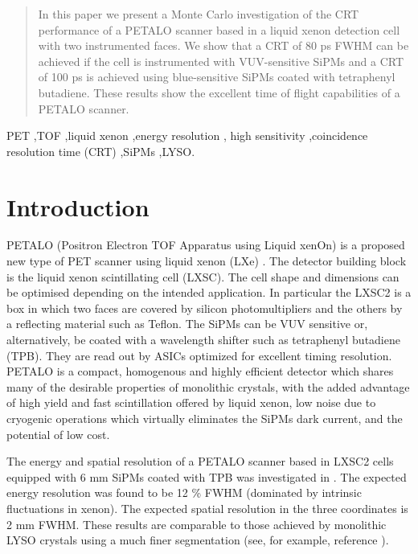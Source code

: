\documentclass[review]{elsarticle}
\begin{document}
\begin{frontmatter}
\begin{abstract}
In this paper we present a Monte Carlo investigation of the CRT performance of a
PETALO scanner based in a liquid xenon detection cell with two instrumented faces. We show that a CRT of 80 ps FWHM can be achieved if the cell is instrumented with VUV-sensitive SiPMs and a CRT of 100 ps is achieved using blue-sensitive SiPMs coated with tetraphenyl butadiene. These results show the excellent time of flight capabilities of a PETALO scanner.   
 \end{abstract}

\begin{keyword}
PET \sep TOF \sep liquid xenon \sep energy resolution \sep
 high sensitivity \sep coincidence resolution time (CRT) \sep SiPMs \sep LYSO.
\end{keyword}

\end{frontmatter}



\section{Introduction}

PETALO (Positron Electron TOF Apparatus using Liquid xenOn) is a proposed new type of PET scanner using liquid xenon (LXe) \cite{Petalo2015}. The detector building block is the liquid xenon scintillating cell (LXSC). The cell shape and dimensions can be optimised depending on the intended application. In particular the LXSC2 is a box in which two faces are covered by silicon photomultipliers and the others by a reflecting material such as Teflon. The SiPMs can be VUV sensitive or, alternatively, be coated with a wavelength shifter such as tetraphenyl butadiene (TPB).  They are read out by ASICs optimized for excellent timing resolution. PETALO is a compact, homogenous and highly efficient detector which shares many of the desirable properties of monolithic crystals, with the added advantage of high yield and fast scintillation offered by liquid xenon, low noise due to cryogenic operations which virtually eliminates the SiPMs dark current, and the potential of low cost. 

The energy and spatial resolution of a PETALO scanner based in LXSC2 cells equipped with 6 mm SiPMs coated with TPB was investigated in \cite{Petalo2015}. The expected energy resolution was found to be 12 \% FWHM (dominated by intrinsic fluctuations in xenon). The expected spatial resolution in the three coordinates is 2 mm FWHM. These results are  comparable to those achieved by monolithic LYSO crystals using a much finer segmentation 
(see, for example, reference \cite{VanDamm2011}). 
\end{document}
